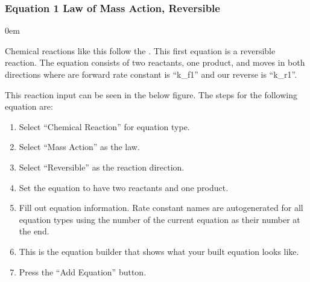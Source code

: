 \documentclass[letterpaper,10pt,english]{sphinxmanual}
\begin{document}
\subsubsection{Equation 1 \sphinxhyphen{} Law of Mass Action, Reversible}
\label{\detokenize{pages/tutorial_sc/createEquations:equation-1-law-of-mass-action-reversible}}

\begin{DUlineblock}{0em}
\item[] 
\end{DUlineblock}

\sphinxAtStartPar
Chemical reactions like this follow the .
This first equation is a reversible reaction. The equation consists of two
reactants, one product, and moves in both directions where are forward rate
constant is “k\_f1” and our reverse is “k\_r1”.

\sphinxAtStartPar
This reaction input can be seen in the below figure.
The steps for the following equation are:
\begin{enumerate}
%
\item {} 
\sphinxAtStartPar
Select “Chemical Reaction” for equation type.

\item {} 
\sphinxAtStartPar
Select “Mass Action” as the law.

\item {} 
\sphinxAtStartPar
Select “Reversible” as the reaction direction.

\item {} 
\sphinxAtStartPar
Set the equation to have two reactants and one product.

\item {} 
\sphinxAtStartPar
Fill out equation information. Rate constant names are autogenerated for all
equation types using the number of the current equation as their number
at the end.

\item {} 
\sphinxAtStartPar
This is the equation builder that shows what your built equation looks like.

\item {} 
\sphinxAtStartPar
Press the “Add Equation” button.

\end{enumerate}
\end{document}
